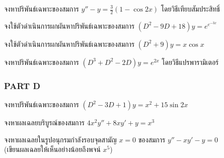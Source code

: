 \documentclass[12pt,final]{novelette} %
\begin{document}
\begin{question}[resume]
    \item {}
    จงหาปริพันธ์เฉพาะของสมการ $y'' - y = \frac32(1-\cos2x)$ โดยวิธีเทียบสัมประสิทธิ์ 



    \item {}
    จงใช้ตัวดำเนินการผกผันหาปริพันธ์เฉพาะของสมการ $(D^2 - 9D + 18)y = e^{e^{-3x}}$ 



    \item {}
    จงใช้ตัวดำเนินการผกผันหาปริพันธ์เฉพาะของสมการ $(D^2+9)y = x \cos x$ 



    \item {}
    จงหาปริพันธ์เฉพาะของสมการ $(D^3 + D^2 - 2D)y = e^{2x}$ โดยวิธีแปรพารามิเตอร์ 


\end{question}

\subsubsection*{PART D}

\begin{question}[resume]
    \item {}
    จงหาปริพันธ์เฉพาะของสมการ $(D^2 - 3D + 1)y = x^2 + 15 \sin 2x$ 



    \item {}
    จงหาผลเฉลยบริบูรณ์ของสมการ $4x^2y'' + 8xy' + y = x^3$ 



    \item {}
    จงหาผลเฉลยในรูปอนุกรมกำลังรอบจุดสามัญ $x=0$ ของสมการ $y'' - xy' - y = 0$ \\
    (เขียนผลเฉลยให้เห็นอย่างน้อยถึงพจน์ $x^5$) 


\end{question}
\end{document}
